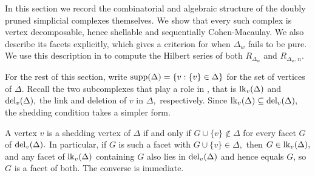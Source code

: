 In this section we record the combinatorial and algebraic structure of the doubly pruned simplicial complexes themselves. We show that every such complex is vertex decomposable, hence shellable and sequentially Cohen-Macaulay. We also describe its facets explicitly, which gives a criterion for when $\Delta_w$ fails to be pure. We use this description in  to compute the Hilbert series of both $R_{\Delta_w}$ and $R_{\Delta_w,n}.$
 
For the rest of this section, write $\mathrm{supp}(\Delta) = \{v: \{v\}\in\Delta\}$ for the set of vertices of $\Delta.$ 
Recall the two subcomplexes that play a role in , that is $\mathrm{lk}_v(\Delta)$ and $\mathrm{del}_v(\Delta),$ the link and deletion of $v$ in $\Delta,$ respectively. 
Since $\mathrm{lk}_v(\Delta)\subseteq\mathrm{del}_v(\Delta),$ the shedding condition takes a simpler form.

\begin{remark}
    A vertex $v$ is a shedding vertex of $\Delta$ if and only if $G\cup\{v\}\not\in\Delta$ for every facet $G$ of $\mathrm{del}_v(\Delta).$ In particular, if $G$ is such a facet with $G\cup\{v\}\in\Delta,$ then $G\in\mathrm{lk}_v(\Delta),$ and any facet of $\mathrm{lk}_v(\Delta)$ containing $G$ also lies in $\mathrm{del}_v(\Delta)$ and hence equals $G$, so $G$ is a facet of both. The converse is immediate.  
\end{remark}


